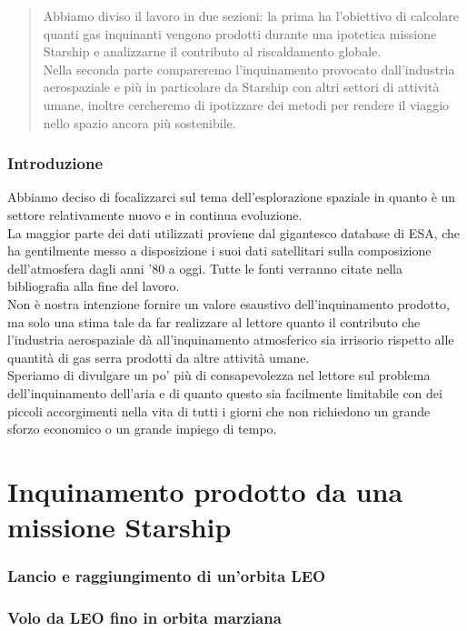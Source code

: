 \documentclass[11pt]{article}
\begin{document}
\begin{abstract}
Abbiamo diviso il lavoro in due sezioni: la prima ha l'obiettivo di calcolare quanti gas inquinanti vengono prodotti durante una ipotetica missione Starship e analizzarne il contributo al riscaldamento globale.\\
Nella seconda parte compareremo l'inquinamento provocato dall'industria aerospaziale e più in particolare da Starship con altri settori di attività umane, inoltre cercheremo di ipotizzare dei metodi per rendere il viaggio nello spazio ancora più sostenibile.
\end{abstract}

\newpage
\tableofcontents
\newpage

\newpage
\section{Introduzione}
Abbiamo deciso di focalizzarci sul tema dell'esplorazione spaziale in quanto è un settore relativamente nuovo e in continua evoluzione. \\
La maggior parte dei dati utilizzati proviene dal gigantesco database di ESA, che ha gentilmente messo a disposizione i suoi dati satellitari sulla composizione dell'atmosfera dagli anni '80 a oggi. Tutte le fonti verranno citate nella bibliografia alla fine del lavoro.\\
Non è nostra intenzione fornire un valore esaustivo dell'inquinamento prodotto, ma solo una stima tale da far realizzare al lettore quanto il contributo che l'industria aerospaziale dà all'inquinamento atmosferico sia irrisorio rispetto alle quantità di gas serra prodotti da altre attività umane.\\
Speriamo di divulgare un po' più di consapevolezza nel lettore sul problema dell'inquinamento dell'aria e di quanto questo sia facilmente limitabile con dei piccoli accorgimenti nella vita di tutti i giorni che non richiedono un grande sforzo economico o un grande impiego di tempo.
\newpage
{}
\part{Inquinamento prodotto da una missione Starship}
\setcounter{section}{0}
\section{Lancio e raggiungimento di un'orbita LEO}

\section{Volo da LEO fino in orbita marziana}

\end{document}
